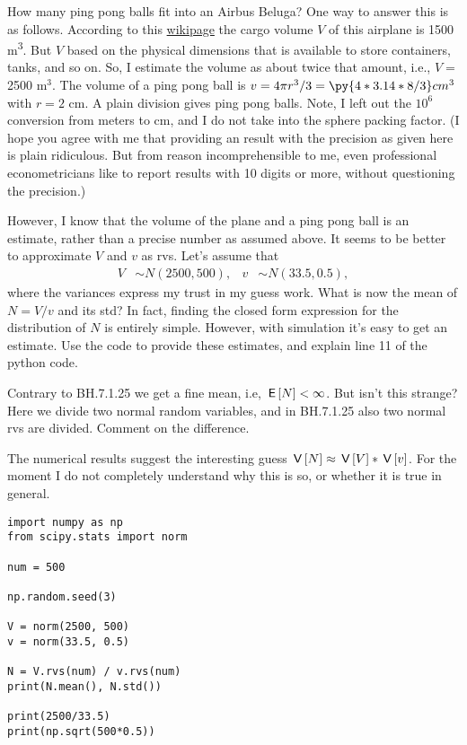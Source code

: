 \documentclass[assignments]{subfiles}
\begin{document}
\begin{exercise}
How many ping pong balls fit into an Airbus Beluga?
One way to answer this is as follows.
According to this \href{https://en.wikipedia.org/wiki/Airbus\_Beluga}{wikipage} the cargo volume $V$ of this airplane is 1500 m\textsuperscript{3}.
But $V$ based on the physical dimensions that is available to store containers, tanks, and so on.
So, I estimate the volume as about twice that amount, i.e., $V = $2500 m$^{3}$. 
The volume of a ping pong ball is $v = 4 \pi r^3/3  = \py{4*3.14*8/3} cm^{3}$ with $r=2$ cm.
A plain division gives  ping pong balls.
Note, I left out the $10^{6}$ conversion from meters to cm, and I do not take into the sphere packing factor.
(I hope you agree with me that providing an result with the precision as given here is plain ridiculous.
But from reason incomprehensible to me, even professional econometricians like to report results with 10 digits or more, without questioning the precision.)


However, I know that the volume of the plane and a ping pong ball is an estimate, rather than a precise number as assumed above.
It seems to be better to approximate $V$ and $v$ as rvs.
Let's assume that
   \begin{align*}
V & \sim N(2500, 500), & v  & \sim N(33.5, 0.5),
\end{align*}
where the variances express my trust in my guess work.
What is now the mean of $N = V/v$ and its std?
In fact, finding the closed form expression for the distribution of $N$ is entirely simple.
However, with simulation it's easy to get an estimate.
Use the code to provide these estimates, and explain line 11 of the python code.



Contrary to BH.7.1.25 we get a fine mean, i.e, $\,\mathsf{E}\left[N\right] < \infty$. But isn't this strange? Here we divide two normal random variables, and in BH.7.1.25 also two normal rvs are divided. Comment on the difference.

The numerical results suggest the interesting guess $\,\mathsf{V}\left[N\right] \approx \,\mathsf{V}\left[V\right] * \,\mathsf{V}\left[v\right]$.
For the moment I do not completely understand why this is so, or whether it is true in general.

\begin{verbatim}
import numpy as np
from scipy.stats import norm

num = 500

np.random.seed(3)

V = norm(2500, 500)
v = norm(33.5, 0.5)

N = V.rvs(num) / v.rvs(num)
print(N.mean(), N.std())

print(2500/33.5)
print(np.sqrt(500*0.5))
\end{verbatim}
\end{exercise}
\end{document}
